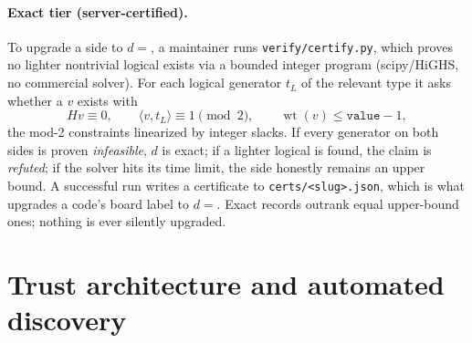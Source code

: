 \documentclass[11pt]{article}
\newcommand{\wt}{\operatorname{wt}}
\begin{document}
	\paragraph{Exact tier (server-certified).} To upgrade a side to $d=$, a
	maintainer runs \texttt{verify/certify.py}, which proves no lighter
	nontrivial logical exists via a bounded integer program (scipy/HiGHS, no
	commercial solver). For each logical generator $t_L$ of the relevant type
	it asks whether a $v$ exists with
	\begin{equation}
		H v \equiv 0,\qquad \langle v,t_L\rangle\equiv 1 \pmod 2,\qquad
		\wt(v)\le \texttt{value}-1,
		\label{eq:milp}
	\end{equation}
	the mod-2 constraints linearized by integer slacks. If every generator on
	both sides is proven \emph{infeasible}, $d$ is exact; if a lighter
	logical is found, the claim is \emph{refuted}; if the solver hits its
	time limit, the side honestly remains an upper bound. A successful run
	writes a certificate to \texttt{certs/<slug>.json}, which is what
	upgrades a code's board label to $d=$. Exact records outrank equal
	upper-bound ones; nothing is ever silently upgraded.

	\section{Trust architecture and automated discovery}
	\label{sec:trust}
\end{document}
